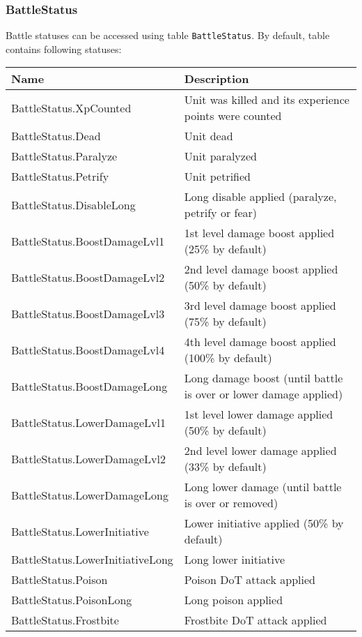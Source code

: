\subsubsection{BattleStatus}
\label{BattleStatus}
Battle statuses can be accessed using table \texttt{BattleStatus}.
By default, table contains following statuses:\\
\begin{tabularx}{\linewidth}{| l | X |}
\hline
\textbf{Name} & \textbf{Description} \\
\hline
BattleStatus.XpCounted & Unit was killed and its experience points were counted\\
\hline
BattleStatus.Dead & Unit dead\\
\hline
BattleStatus.Paralyze & Unit paralyzed\\
\hline
BattleStatus.Petrify & Unit petrified\\
\hline
BattleStatus.DisableLong & Long disable applied (paralyze, petrify or fear)\\
\hline
BattleStatus.BoostDamageLvl1 & 1st level damage boost applied (25\% by default)\\
\hline
BattleStatus.BoostDamageLvl2 & 2nd level damage boost applied (50\% by default)\\
\hline
BattleStatus.BoostDamageLvl3 & 3rd level damage boost applied (75\% by default)\\
\hline
BattleStatus.BoostDamageLvl4 & 4th level damage boost applied (100\% by default)\\
\hline
BattleStatus.BoostDamageLong & Long damage boost (until battle is over or lower damage applied)\\
\hline
BattleStatus.LowerDamageLvl1 & 1st level lower damage applied (50\% by default)\\
\hline
BattleStatus.LowerDamageLvl2 & 2nd level lower damage applied (33\% by default)\\
\hline
BattleStatus.LowerDamageLong & Long lower damage (until battle is over or removed)\\
\hline
BattleStatus.LowerInitiative & Lower initiative applied (50\% by default)\\
\hline
BattleStatus.LowerInitiativeLong & Long lower initiative\\
\hline
BattleStatus.Poison & Poison DoT attack applied\\
\hline
BattleStatus.PoisonLong & Long poison applied\\
\hline
BattleStatus.Frostbite & Frostbite DoT attack applied\\

\end{tabularx}

